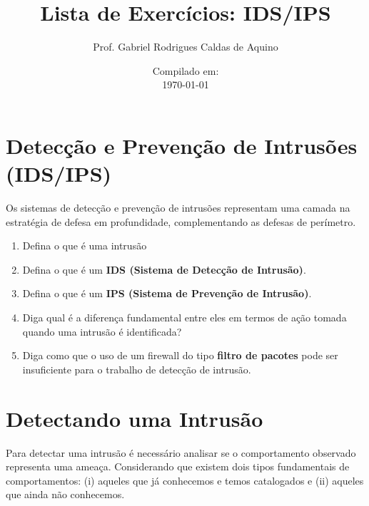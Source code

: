     \title{Lista de Exercícios: IDS/IPS}
        \author{Prof. Gabriel Rodrigues Caldas de Aquino}
        \date{Compilado em: \\ \today}



\maketitle

\section{Detecção e Prevenção de Intrusões (IDS/IPS)}
Os sistemas de detecção e prevenção de intrusões representam uma camada  na estratégia de defesa em profundidade, complementando as defesas de perímetro.

\begin{enumerate}
    \item Defina o que é uma intrusão
    \item Defina o que é um \textbf{IDS (Sistema de Detecção de Intrusão)}.
    \item Defina o que é um \textbf{IPS (Sistema de Prevenção de Intrusão)}.
    \item Diga qual é a diferença fundamental entre eles em termos de ação tomada quando uma intrusão é identificada?
    \item Diga como que o uso de um firewall do tipo \textbf{filtro de pacotes} pode ser insuficiente para o trabalho de detecção de intrusão.
\end{enumerate}

\section{Detectando uma Intrusão}
Para detectar uma intrusão é necessário analisar se o comportamento observado representa uma ameaça. Considerando que existem dois tipos fundamentais de comportamentos: (i) aqueles que já conhecemos e temos catalogados e (ii) aqueles que ainda não conhecemos.

